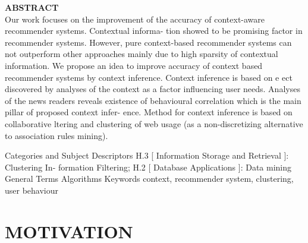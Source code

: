 \documentclass[a4paper,8pt]{article}
\begin{document}
\begin{multicols}{2}


\noindent\huge\textbf{ABSTRACT} \\

\noindent Our  work  focuses  on  the  improvement  of  the  accuracy  of
context-aware recommender systems.  Contextual informa-
tion showed to be promising factor in recommender systems.
However, pure context-based recommender systems can not
outperform  other  approaches  mainly  due  to  high  sparsity
of contextual information.  We propose an idea to improve
accuracy of context based recommender systems by context
inference.   Context  inference  is  based  on  e ect  discovered
by analyses of the context as a factor influencing user needs.
Analyses of the news readers reveals existence of behavioural
correlation which is the main pillar of proposed context infer-
ence.  Method for context inference is based on collaborative
 ltering and clustering of web usage (as a non-discretizing
alternative to association rules mining).

Categories and Subject Descriptors
H.3 [
Information Storage and Retrieval
]: Clustering In-
formation Filtering;  H.2 [
Database Applications
]:  Data
mining
General Terms
Algorithms
Keywords
context, recommender system, clustering, user behaviour

\section{MOTIVATION}


\end{multicols}
\end{document}
